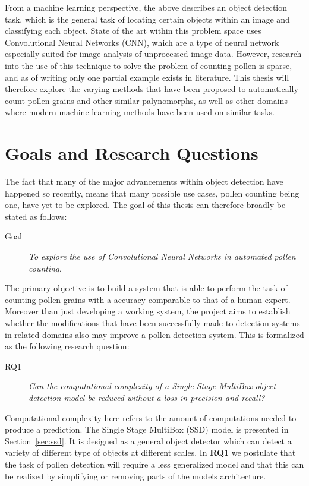 From a machine learning perspective, the above describes an object detection task, which is the general task of locating certain objects within an image and classifying each object.
State of the art within this problem space uses Convolutional Neural Networks (CNN), which are a type of neural network especially suited for image analysis of unprocessed image data.
However, research into the use of this technique to solve the problem of counting pollen is sparse, and as of writing only one partial example exists in literature.
This thesis will therefore explore the varying methods that have been proposed to automatically count pollen grains and other similar palynomorphs, as well as other domains where modern machine learning methods have been used on similar tasks.

\section{Goals and Research Questions}\label{sec:Goals and Research Questions}
The fact that many of the major advancements within object detection have happened so recently, means that many possible use cases, pollen counting being one, have yet to be explored.
The goal of this thesis can therefore broadly be stated as follows:

\begin{description}
\item[Goal] \textit{To explore the use of Convolutional Neural Networks in automated pollen counting.}
\end{description}

The primary objective is to build a system that is able to perform the task of counting pollen grains with a accuracy comparable to that of a human expert.
Moreover than just developing a working system, the project aims to establish whether the modifications that have been successfully made to detection systems in related domains also may improve a pollen detection system.
This is formalized as the following research question: 

\begin{description}
\item[RQ1] \textit{Can the computational complexity of a Single Stage MultiBox object detection model be reduced without a loss in precision and recall?}
\end{description}

Computational complexity here refers to the amount of computations needed to produce a prediction.
The Single Stage MultiBox (SSD) model is presented in Section~\ref{sec:ssd}.
It is designed as a general object detector which can detect a variety of different type of objects at different scales.
In \textbf{RQ1} we postulate that the task of pollen detection will require a less generalized model and that this can be realized by simplifying or removing parts of the models architecture.
 
